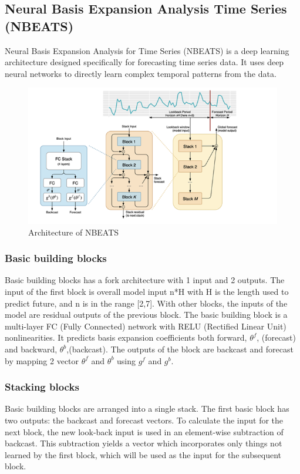 \documentclass{ieeeojies}
\begin{document}
\subsection{Neural Basis Expansion Analysis Time Series (NBEATS)}
Neural Basis Expansion Analysis for Time Series \cite{b13} (NBEATS) is a deep learning architecture designed specifically for forecasting time series data. It uses deep neural networks to directly learn complex temporal patterns from the data.
\begin{figure}[H]
	\centering
	\begin{minipage}{0.40\textwidth}
		\centering
		\includegraphics[width=1\textwidth]{bibliography/Images/NBEATS_Img1.png}
		\caption{Architecture of NBEATS}
		\label{fig:1}
	\end{minipage}
\end{figure}
\subsubsection{Basic building blocks}
Basic building blocks has a fork architecture with 1 input and 2 outputs. The input of the first block is overall model input n*H with H is the length used to predict future, and n is in the range [2,7]. With other blocks, the inputs of the model are residual outputs of the previous block. The basic building block is a multi-layer FC (Fully Connected) network with RELU (Rectified Linear Unit) nonlinearities. It predicts basis expansion coefficients both forward, $\theta^{f}$, (forecast) and backward, $\theta^{b}$,(backcast). The outputs of the block are backcast and forecast by  mapping 2 vector $\theta^{f}$ and $\theta^{b}$ using $g^{f}$ and $g^{b}$.
\subsubsection{Stacking blocks}
Basic building blocks are arranged into a single stack. The first basic block has two outputs: the backcast and forecast vectors. To calculate the input for the next block, the new look-back input is used in an element-wise subtraction of backcast. This subtraction yields a vector which incorporates only things not learned by the first block, which will be used as the input for the subsequent block.
\end{document}
